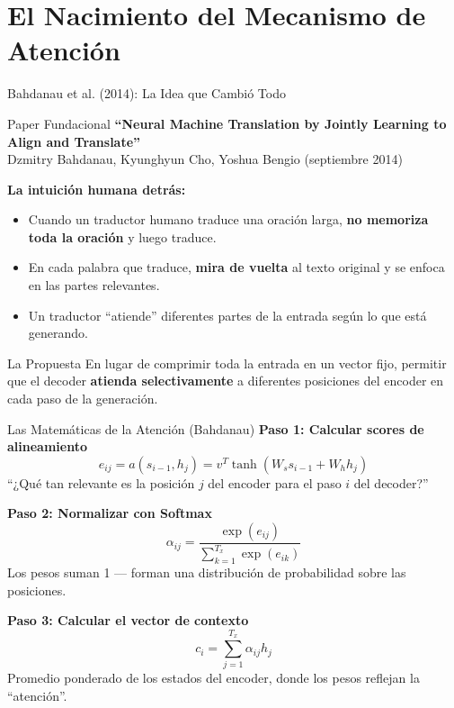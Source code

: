 \documentclass[aspectratio=169]{beamer}
\begin{document}
\section{El Nacimiento del Mecanismo de Atención}

\begin{frame}{Bahdanau et al. (2014): La Idea que Cambió Todo}
    \begin{block}{Paper Fundacional}
        \textbf{``Neural Machine Translation by Jointly Learning to Align and Translate''} \\
        Dzmitry Bahdanau, Kyunghyun Cho, Yoshua Bengio (septiembre 2014)
    \end{block}
    
    \vspace{0.3cm}
    \textbf{La intuición humana detrás:}
    \begin{itemize}
        \item Cuando un traductor humano traduce una oración larga, \textbf{no memoriza toda la oración} y luego traduce.
        \item En cada palabra que traduce, \textbf{mira de vuelta} al texto original y se enfoca en las partes relevantes.
        \item Un traductor ``atiende'' diferentes partes de la entrada según lo que está generando.
    \end{itemize}
    
    \vspace{0.3cm}
    \begin{exampleblock}{La Propuesta}
        En lugar de comprimir toda la entrada en un vector fijo, permitir que el decoder \textbf{atienda selectivamente} a diferentes posiciones del encoder en cada paso de la generación.
    \end{exampleblock}
\end{frame}

\begin{frame}{Las Matemáticas de la Atención (Bahdanau)}
    \textbf{Paso 1: Calcular scores de alineamiento}
    \begin{equation*}
        e_{ij} = a(s_{i-1}, h_j) = v^T \tanh(W_s s_{i-1} + W_h h_j)
    \end{equation*}
    ``¿Qué tan relevante es la posición $j$ del encoder para el paso $i$ del decoder?''
    
    \vspace{0.3cm}
    \textbf{Paso 2: Normalizar con Softmax}
    \begin{equation*}
        \alpha_{ij} = \frac{\exp(e_{ij})}{\sum_{k=1}^{T_x} \exp(e_{ik})}
    \end{equation*}
    Los pesos suman 1 --- forman una distribución de probabilidad sobre las posiciones.
    
    \vspace{0.3cm}
    \textbf{Paso 3: Calcular el vector de contexto}
    \begin{equation*}
        c_i = \sum_{j=1}^{T_x} \alpha_{ij} h_j
    \end{equation*}
    Promedio ponderado de los estados del encoder, donde los pesos reflejan la ``atención''.
\end{frame}
\end{document}
